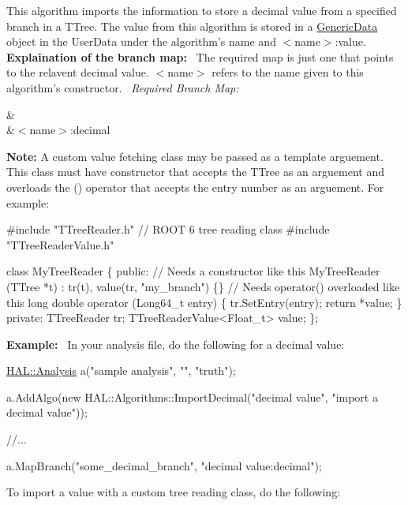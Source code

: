 This algorithm imports the information to store a decimal value from a specified branch in a T\+Tree. The value from this algorithm is stored in a \hyperlink{class_h_a_l_1_1_generic_data}{Generic\+Data} object in the User\+Data under the algorithm's name and $<$name$>$\+:value.~\newline
~\newline
{\bfseries Explaination of the branch map\+:}~\newline
The required map is just one that points to the relavent decimal value. $<$name$>$ refers to the name given to this algorithm's constructor.~\newline
{\itshape Required Branch Map\+:} \begin{TabularC}{2}
\hline
{}&\PBS{}\\
&\PBS\centering $<$name$>$\+:decimal \\
\end{TabularC}
{\bfseries Note\+:} A custom value fetching class may be passed as a template arguement. This class must have constructor that accepts the T\+Tree as an arguement and overloads the () operator that accepts the entry number as an arguement. For example\+: 
\begin{DoxyCode}
\textcolor{preprocessor}{#include "TTreeReader.h"} \textcolor{comment}{// ROOT 6 tree reading class}
\textcolor{preprocessor}{#include "TTreeReaderValue.h"}

\textcolor{keyword}{class }MyTreeReader \{
\textcolor{keyword}{public}:
 \textcolor{comment}{// Needs a constructor like this}
 MyTreeReader (TTree *t) : tr(t), value(tr, \textcolor{stringliteral}{"my\_branch"}) \{\}
 \textcolor{comment}{// Needs operator() overloaded like this}
 \textcolor{keywordtype}{long} \textcolor{keywordtype}{double} operator (Long64\_t entry) \{
   tr.SetEntry(entry);
   \textcolor{keywordflow}{return} *value;
 \}
\textcolor{keyword}{private}:
 TTreeReader tr;
 TTreeReaderValue<Float\_t> value;
\};
\end{DoxyCode}
 {\bfseries Example\+:}~\newline
In your analysis file, do the following for a decimal value\+:


\begin{DoxyCode}
\hyperlink{class_h_a_l_1_1_analysis}{HAL::Analysis} a(\textcolor{stringliteral}{"sample analysis"}, \textcolor{stringliteral}{""}, \textcolor{stringliteral}{"truth"});

a.AddAlgo(\textcolor{keyword}{new} HAL::Algorithms::ImportDecimal(\textcolor{stringliteral}{"decimal value"}, \textcolor{stringliteral}{"import a decimal value"}));

\textcolor{comment}{//...}

a.MapBranch(\textcolor{stringliteral}{"some\_decimal\_branch"}, \textcolor{stringliteral}{"decimal value:decimal"});
\end{DoxyCode}
 To import a value with a custom tree reading class, do the following\+:


